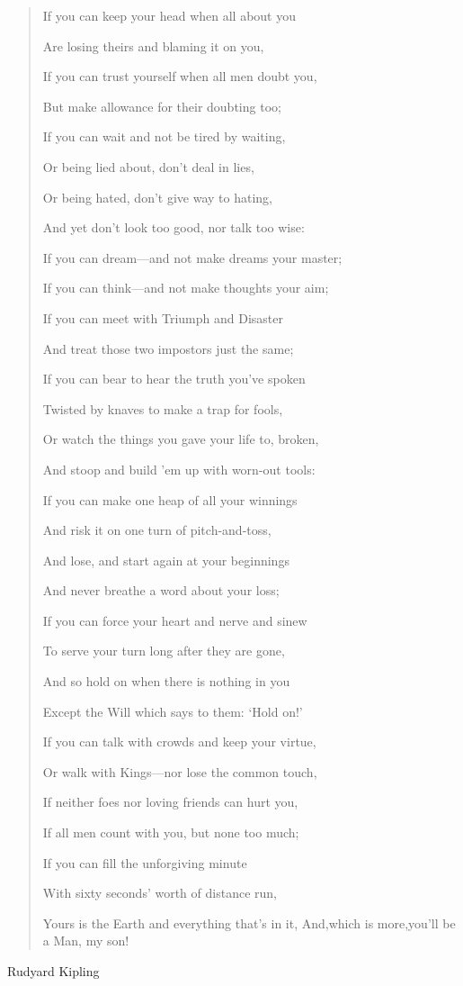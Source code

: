 \documentclass[french]{beamer}
\begin{document}
\begin{frame}
  
\begin{quote}
  {\tiny
    If you can keep your head when all about you

Are losing theirs and blaming it on you,

If you can trust yourself when all men doubt you,

But make allowance for their doubting too;

If you can wait and not be tired by waiting,

Or being lied about, don't deal in lies,

Or being hated, don't give way to hating,

And yet don't look too good, nor talk too wise:

If you can dream---and not make dreams your master;

If you can think---and not make thoughts your aim;

If you can meet with Triumph and Disaster

And treat those two impostors just the same;

If you can bear to hear the truth you've spoken

Twisted by knaves to make a trap for fools,

Or watch the things you gave your life to, broken,

And stoop and build 'em up with worn-out tools:

If you can make one heap of all your winnings

And risk it on one turn of pitch-and-toss,

And lose, and start again at your beginnings

And never breathe a word about your loss;

If you can force your heart and nerve and sinew

To serve your turn long after they are gone,

And so hold on when there is nothing in you

Except the Will which says to them: `Hold on!'

If you can talk with crowds and keep your virtue,

Or walk with Kings---nor lose the common touch,

If neither foes nor loving friends can hurt you,

If all men count with you, but none too much;

If you can fill the unforgiving minute

With sixty seconds' worth of distance run,

Yours is the Earth and everything that's in it,
And,which is more,you'll be a Man, my son!


}
\end{quote}

Rudyard Kipling

\end{frame}
\end{document}
